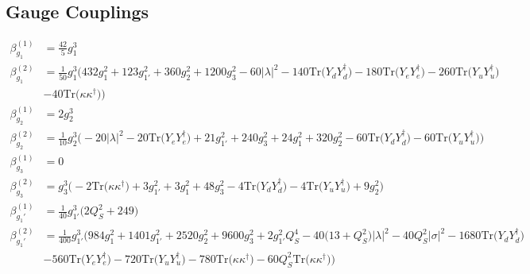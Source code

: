 \subsection{Gauge Couplings}
{\allowdisplaybreaks  \begin{align} 
\beta_{g_1}^{(1)} & =  
\frac{42}{5} g_{1}^{3} \\ 
\beta_{g_1}^{(2)} & =  
\frac{1}{50} g_{1}^{3} \Big(432 g_{1}^{2} +123 g_{1'}^{2} +360 g_{2}^{2} +1200 g_{3}^{2} -60 |\lambda|^2 -140 \mbox{Tr}\Big({Y_d  Y_{d}^{\dagger}}\Big) -180 \mbox{Tr}\Big({Y_e  Y_{e}^{\dagger}}\Big) -260 \mbox{Tr}\Big({Y_u  Y_{u}^{\dagger}}\Big) \nonumber \\ 
 &-40 \mbox{Tr}\Big({\kappa  \kappa^{\dagger}}\Big) \Big)\\ 
\beta_{g_2}^{(1)} & =  
2 g_{2}^{3} \\ 
\beta_{g_2}^{(2)} & =  
\frac{1}{10} g_{2}^{3} \Big(-20 |\lambda|^2  -20 \mbox{Tr}\Big({Y_e  Y_{e}^{\dagger}}\Big)  + 21 g_{1'}^{2}  + 240 g_{3}^{2}  + 24 g_{1}^{2}  + 320 g_{2}^{2}  -60 \mbox{Tr}\Big({Y_d  Y_{d}^{\dagger}}\Big)  -60 \mbox{Tr}\Big({Y_u  Y_{u}^{\dagger}}\Big) \Big)\\ 
\beta_{g_3}^{(1)} & =  
0\\ 
\beta_{g_3}^{(2)} & =  
g_{3}^{3} \Big(-2 \mbox{Tr}\Big({\kappa  \kappa^{\dagger}}\Big)  + 3 g_{1'}^{2}  + 3 g_{1}^{2}  + 48 g_{3}^{2}  -4 \mbox{Tr}\Big({Y_d  Y_{d}^{\dagger}}\Big)  -4 \mbox{Tr}\Big({Y_u  Y_{u}^{\dagger}}\Big)  + 9 g_{2}^{2} \Big)\\ 
\beta_{g_1'}^{(1)} & =  
\frac{1}{40} g_{1'}^{3} \Big(2 Q_{S}^{2}  + 249\Big)\\ 
\beta_{g_1'}^{(2)} & =  
\frac{1}{400} g_{1'}^{3} \Big(984 g_{1}^{2} +1401 g_{1'}^{2} +2520 g_{2}^{2} +9600 g_{3}^{2} +2 g_{1'}^{2} Q_{S}^{4} -40 \Big(13 + Q_{S}^{2}\Big)|\lambda|^2 -40 Q_{S}^{2} |\sigma|^2 -1680 \mbox{Tr}\Big({Y_d  Y_{d}^{\dagger}}\Big) \nonumber \\ 
 &-560 \mbox{Tr}\Big({Y_e  Y_{e}^{\dagger}}\Big) -720 \mbox{Tr}\Big({Y_u  Y_{u}^{\dagger}}\Big) -780 \mbox{Tr}\Big({\kappa  \kappa^{\dagger}}\Big) -60 Q_{S}^{2} \mbox{Tr}\Big({\kappa  \kappa^{\dagger}}\Big) \Big)
\end{align}} 
